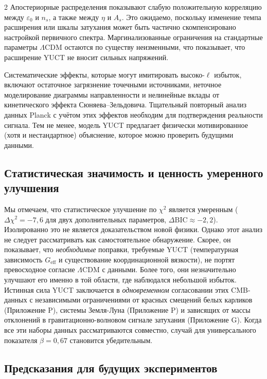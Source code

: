 \documentclass[11pt,a4paper]{article}
\begin{document}
\begin{multicols}{2}
		Апостериорные распределения показывают слабую положительную корреляцию между $\varepsilon_0$ и $n_s$, а также между $\eta$ и $A_s$. Это ожидаемо, поскольку изменение темпа расширения или шкалы затухания может быть частично скомпенсировано настройкой первичного спектра. Маргинализованные ограничения на стандартные параметры $\Lambda$CDM остаются по существу неизменными, что показывает, что расширение YUCT не вносит сильных напряжений.
		
		Систематические эффекты, которые могут имитировать высоко-$\ell$ избыток, включают остаточное загрязнение точечными источниками, неточное моделирование диаграммы направленности и нелинейные вклады от кинетического эффекта Сюняева--Зельдовича. Тщательный повторный анализ данных Planck с учётом этих эффектов необходим для подтверждения реальности сигнала. Тем не менее, модель YUCT предлагает физически мотивированное (хотя и нестандартное) объяснение, которое можно проверить будущими данными.
		
		\subsection{Статистическая значимость и ценность умеренного улучшения}
		
		Мы отмечаем, что статистическое улучшение по $\chi^2$ является умеренным ($\Delta\chi^2 = -7,6$ для двух дополнительных параметров, $\Delta\mathrm{BIC} \approx -2,2$). Изолированно это не является доказательством новой физики. Однако этот анализ не следует рассматривать как самостоятельное обнаружение. Скорее, он показывает, что \emph{необходимые} поправки, требуемые YUCT (температурная зависимость $G_{\mathrm{eff}}$ и существование координационной вязкости), не портят превосходное согласие $\Lambda$CDM с данными. Более того, они незначительно улучшают его именно в той области, где наблюдался небольшой избыток. Истинная сила YUCT заключается в \emph{одновременном} согласовании этих CMB-данных с независимыми ограничениями от красных смещений белых карликов (Приложение P), системы Земля-Луна (Приложение P) и зависящих от массы отклонений в гравитационно-волновом сигнале затухания (Приложение G). Когда все эти наборы данных рассматриваются совместно, случай для универсального показателя $\beta=0,67$ становится убедительным.
		
		\subsection{Предсказания для будущих экспериментов}
		

\end{multicols}
\end{document}
